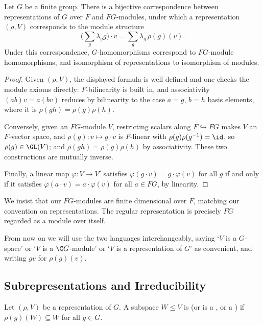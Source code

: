 \begin{proposition}
	Let $G$ be a finite group. There is a bijective correspondence between representations of $G$ over $F$ and $FG$-modules, under which a representation $(\rho, V)$ corresponds to the module structure
	$$\Big(\sum_g \lambda_g g\Big) \cdot v = \sum_g \lambda_g\, \rho(g)(v).$$
	Under this correspondence, $G$-homomorphisms correspond to $FG$-module homomorphisms, and isomorphism of representations to isomorphism of modules.
\end{proposition}
\begin{proof}
	Given $(\rho, V)$, the displayed formula is well defined and one checks the module axioms directly: $F$-bilinearity is built in, and associativity $(ab)v = a(bv)$ reduces by bilinearity to the case $a = g$, $b = h$ basis elements, where it is $\rho(gh) = \rho(g)\rho(h)$.

	Conversely, given an $FG$-module $V$, restricting scalars along $F \hookrightarrow FG$ makes $V$ an $F$-vector space, and $\rho(g) : v \mapsto g \cdot v$ is $F$-linear with $\rho(g)\rho(g^{-1}) = \id$, so $\rho(g) \in \GL(V)$; and $\rho(gh) = \rho(g)\rho(h)$ by associativity. These two constructions are mutually inverse.

	Finally, a linear map $\varphi : V \to V'$ satisfies $\varphi(g \cdot v) = g\cdot \varphi(v)$ for all $g$ if and only if it satisfies $\varphi(a \cdot v) = a \cdot \varphi(v)$ for all $a \in FG$, by linearity.
\end{proof}

\begin{remark}
	We insist that our $FG$-modules are finite dimensional over $F$, matching our convention on representations. The regular representation is precisely $FG$ regarded as a module over itself.
\end{remark}

From now on we will use the two languages interchangeably, saying `$V$ is a $G$-space' or `$V$ is a $\C G$-module' or `$V$ is a representation of $G$' as convenient, and writing $gv$ for $\rho(g)(v)$.

\subsection{Subrepresentations and Irreducibility}

\begin{definition}[Subrepresentation]
	Let $(\rho, V)$ be a representation of $G$. A subspace $W \leq V$ is  (or is a , or a ) if $\rho(g)(W) \subseteq W$ for all $g \in G$.
\end{definition}

